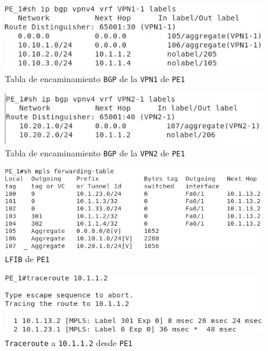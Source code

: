 \documentclass[11pt]{article}
\begin{document}
            \begin{figure}
                \centering
                \includegraphics[width=0.6\linewidth]{ip_bgp_VPN1_PE_1.png}
                \caption{Tabla de encaminamiento \texttt{BGP} de la \texttt{VPN1} de \texttt{PE1}}
                \label{fig:ip_bgp_VPN1_PE_1}
            \end{figure}

            \begin{figure}
                \centering
                \includegraphics[width=0.6\linewidth]{ip_bgp_VPN2_PE_1.png}
                \caption{Tabla de encaminamiento \texttt{BGP} de la \texttt{VPN2} de \texttt{PE1}}
                \label{fig:ip_bgp_VPN2_PE_1}
            \end{figure}

            \begin{figure}
                \centering
                \includegraphics[width=0.6\linewidth]{mpls_table_PE_1.png}
                \caption{\texttt{LFIB} de \texttt{PE1}}
                \label{fig:mpls_table_PE_1}
            \end{figure}

            \begin{figure}
                \centering
                \includegraphics[width=0.6\linewidth]{trace_10.1.1.2_PE_1.png}
                \caption{\texttt{Traceroute} a \texttt{10.1.1.2} desde \texttt{PE1}}
                \label{fig:trace_10.1.1.2_PE_1}
            \end{figure}
\end{document}
